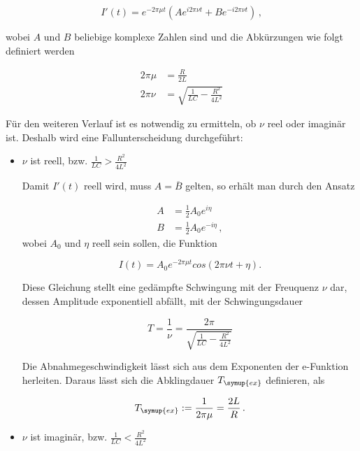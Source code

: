 \begin{equation*}
  I'(t) = e^{-2 \pi \mu t} (A e^{i 2 \pi \nu t} + B e^{-i 2 \pi \nu t}) \, ,
\end{equation*}

wobei $A$ und $B$ beliebige komplexe Zahlen sind und die Abkürzungen wie folgt definiert werden

\begin{align*}
  2 \pi \mu &= \frac{R}{2L} \\
  2 \pi \nu &= \sqrt{\frac{1}{LC} - \frac{R^2}{4L^2}}
\end{align*}

Für den weiteren Verlauf ist es notwendig zu ermitteln, ob $\nu$ reel oder imaginär ist. Deshalb wird eine
Fallunterscheidung durchgeführt:

\begin{itemize}
  \item $\nu $ ist reell, bzw. $\frac{1}{LC} > \frac{R^2}{4L^2}$

  Damit $I'(t)$ reell wird, muss $A=\overline{B}$ gelten, so erhält man durch den Ansatz

  \begin{align*}
    A &= \frac{1}{2} A_0 e^{i \eta}\\
    B &= \frac{1}{2} A_0 e^{-i \eta} \, ,
  \end{align*}
  wobei $A_0$ und $\eta$ reell sein sollen, die Funktion

  \begin{equation*}
    I(t) = A_0 e^{-2 \pi \mu t} cos(2 \pi \nu t + \eta).
  \end{equation*}

  Diese Gleichung stellt eine gedämpfte Schwingung mit der Freuquenz $\nu$ dar, dessen Amplitude exponentiell
  abfällt, mit der Schwingungsdauer

  \begin{equation*}
    T = \frac{1}{\nu} = \frac{2 \pi}{\sqrt{\frac{1}{LC} - \frac{R^2}{4L^2}}}
  \end{equation*}

  Die Abnahmegeschwindigkeit lässt sich aus dem Exponenten der e-Funktion herleiten. Daraus lässt sich
  die Abklingdauer $T_{\symup{ex}}$ definieren, als

  \begin{equation*}
    T_{\symup{ex}} := \frac{1}{2 \pi \mu} = \frac{2L}{R} \, .
  \end{equation*}

  \item $\nu $ ist imaginär, bzw. $\frac{1}{LC} < \frac{R^2}{4L^2}$


\end{itemize}
